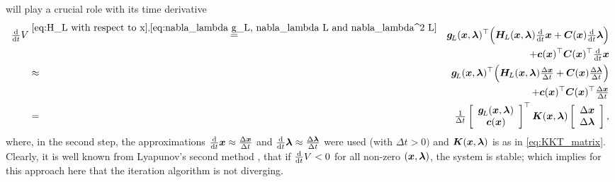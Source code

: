 \documentclass[journal]{IEEEtranTIE}
\newcommand{\KYCH}[1]{{\color{blue} [KC: #1]}} %
\begin{document}
will play a crucial role with its time derivative
%
\begin{eqnarray}
\ddtsmall V & \stackrel{\eqref{eq:H_L with respect to x},\eqref{eq:nabla_lambda g_L, nabla_lambda L and nabla_lambda^2 L}}{=} & \mv{g}_{\!L}(\mv{x},\mv{\lambda})^\top \Big( \mm{H}_{\! L}(\mv{x},\mv{\lambda})\ddtsmall \mv{x} + \mm{C}(\mv{x})\ddtsmall \mv{\lambda} \Big) \notag  \\ 
& & +  \mv{c}(\mv{x})^\top \mm{C}(\mv{x})^\top\ddtsmall \mv{x} \label{eq:d/dt V} \\
& \approx & \mv{g}_{\!L}(\mv{x},\mv{\lambda})^\top \Big( \mm{H}_{\! L}(\mv{x},\mv{\lambda})\tfrac{\Delta \mv{x}}{\Delta t}  + \mm{C}(\mv{x}) \tfrac{\Delta \mv{\lambda}}{\Delta t}  \Big) \notag   \\ 
& & + \mv{c}(\mv{x})^\top \mm{C}(\mv{x})^\top \tfrac{\Delta \mv{x}}{\Delta t}\\
& = & \tfrac{1}{\Delta t}\left[ {\begin{array}{*{20}{c}}
{\mv{g}_{\!L}}(\mv{x},\mv{\lambda})\\
{\mv{c}}(\mv{x})
\end{array}} \right]^\top \mm{K}(\mv{x},\mv{\lambda}) \left[ {\begin{array}{*{20}{c}}
{\Delta \mv{x}}\\
{\Delta \mv{\lambda}}
\end{array}} \right],\label{eq:Delta V / Delta t}
\end{eqnarray}
%
where, in the second step, the approximations $\tfrac{\mathrm{d}}{\mathrm{d}t} \boldsymbol{x} \approx \tfrac{\Delta \boldsymbol{x}}{\Delta t} $ and $\tfrac{\mathrm{d}}{\mathrm{d}t} \boldsymbol{\lambda} \approx  \tfrac{\Delta \boldsymbol{\lambda}}{\Delta t}$ were used (with $\Delta t >0)$ and $\boldsymbol{K}(\boldsymbol{x},\boldsymbol{\lambda})$ is as in \eqref{eq:KKT_matrix}.
Clearly, it is well known from Lyapunov's second method \cite{khalil2002nonlinear}, that if $\tfrac{\mathrm{d}}{\mathrm{d}t} V < 0$ for all non-zero $(\boldsymbol{x},\boldsymbol{\lambda})$, the system is stable; which implies for this approach here that the iteration algorithm is not diverging.
\end{document}

